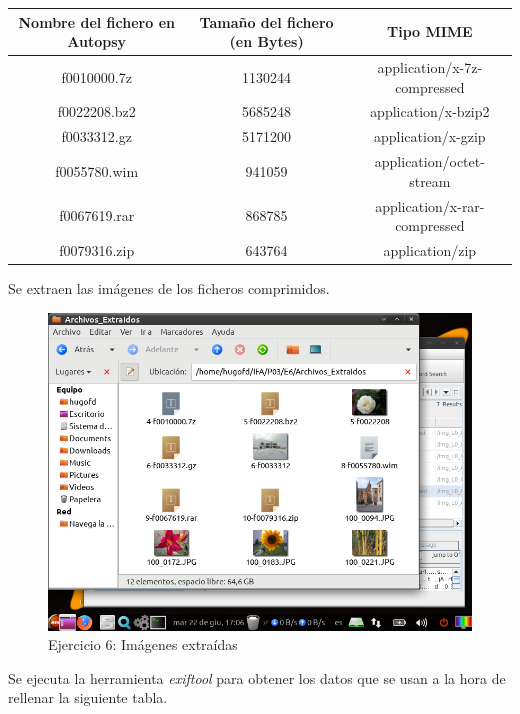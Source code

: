 \documentclass[11pt]{article}
\begin{document}
\begin{table}[H]
    \centering
    \begin{tabular}{|c|c|c|}
        \hline
        Nombre del fichero en Autopsy & Tamaño del fichero (en Bytes) & Tipo MIME \\
        \hline\hline
        f0010000.7z & 1130244 & application/x-7z-compressed \\
        \hline
        f0022208.bz2 & 5685248 & application/x-bzip2 \\
        \hline
        f0033312.gz & 5171200 & application/x-gzip \\
        \hline
        f0055780.wim & 941059 & application/octet-stream \\
        \hline
        f0067619.rar & 868785 & application/x-rar-compressed \\
        \hline
        f0079316.zip & 643764 & application/zip \\
        \hline
    \end{tabular}
\end{table}

Se extraen las imágenes de los ficheros comprimidos.

\begin{figure}[H]
    \caption{Ejercicio 6: Imágenes extraídas}
    \centering
    \includegraphics[scale=0.7]{e6-6.png}
\end{figure}

Se ejecuta la herramienta \textit{exiftool} para obtener los datos que se usan a la hora de rellenar la siguiente tabla.
\end{document}
